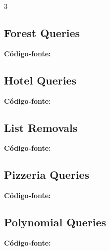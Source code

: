 \documentclass[8pt]{extarticle}
\begin{document}
\begin{multicols*}{3}
\subsection{Forest Queries}
\begin{caixaenunciado}

\end{caixaenunciado}
\vspace{0.3cm}
\noindent\textbf{Código-fonte:}


\subsection{Hotel Queries}
\begin{caixaenunciado}

\end{caixaenunciado}
\vspace{0.3cm}
\noindent\textbf{Código-fonte:}


\subsection{List Removals}
\begin{caixaenunciado}

\end{caixaenunciado}
\vspace{0.3cm}
\noindent\textbf{Código-fonte:}


\subsection{Pizzeria Queries}
\begin{caixaenunciado}

\end{caixaenunciado}
\vspace{0.3cm}
\noindent\textbf{Código-fonte:}


\subsection{Polynomial Queries}
\begin{caixaenunciado}

\end{caixaenunciado}
\vspace{0.3cm}
\noindent\textbf{Código-fonte:}



\end{multicols*}
\end{document}
